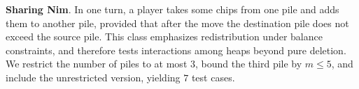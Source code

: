 \documentclass[review]{elsarticle}
\newcommand{\set}[1]{\{ #1 \}}
\newcommand{\tuple}[1]{\langle {#1} \rangle}
\newcommand{\true}{\top}
\newcommand{\statevar}{\mathcal{X}}
\newcommand{\act}{\mathcal{A}}
\newcommand{\constraint}{\mathcal{C}}
\newcommand{\estate}{\mathcal{E}}
\newcommand{\pre}{\mathtt{pre}}
\newcommand{\eff}{\mathtt{eff}}
\begin{document}
{\color{red}\textbf{Sharing Nim}. In one turn, a player takes some chips from one pile and adds them to another pile, provided that after the move the destination pile does not exceed the source pile.}
{\color{red}This class emphasizes redistribution under balance constraints, and therefore tests interactions among heaps beyond pure deletion.}
{\color{red}We restrict the number of piles to at most $3$, bound the third pile by $m \le 5$, and include the unrestricted version, yielding $7$ test cases.}
\end{document}
